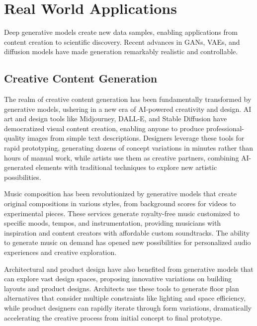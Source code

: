 
\section{Real World Applications}
\label{sec:generative-real-world}


Deep generative models create new data samples, enabling applications from content creation to scientific discovery. Recent advances in GANs, VAEs, and diffusion models have made generation remarkably realistic and controllable.

\subsection{Creative Content Generation}

The realm of creative content generation has been fundamentally transformed by generative models, ushering in a new era of AI-powered creativity and design. AI art and design tools like Midjourney, DALL-E, and Stable Diffusion have democratized visual content creation, enabling anyone to produce professional-quality images from simple text descriptions. Designers leverage these tools for rapid prototyping, generating dozens of concept variations in minutes rather than hours of manual work, while artists use them as creative partners, combining AI-generated elements with traditional techniques to explore new artistic possibilities.

Music composition has been revolutionized by generative models that create original compositions in various styles, from background scores for videos to experimental pieces. These services generate royalty-free music customized to specific moods, tempos, and instrumentation, providing musicians with inspiration and content creators with affordable custom soundtracks. The ability to generate music on demand has opened new possibilities for personalized audio experiences and creative exploration.

Architectural and product design have also benefited from generative models that can explore vast design spaces, proposing innovative variations on building layouts and product designs. Architects use these tools to generate floor plan alternatives that consider multiple constraints like lighting and space efficiency, while product designers can rapidly iterate through form variations, dramatically accelerating the creative process from initial concept to final prototype.

